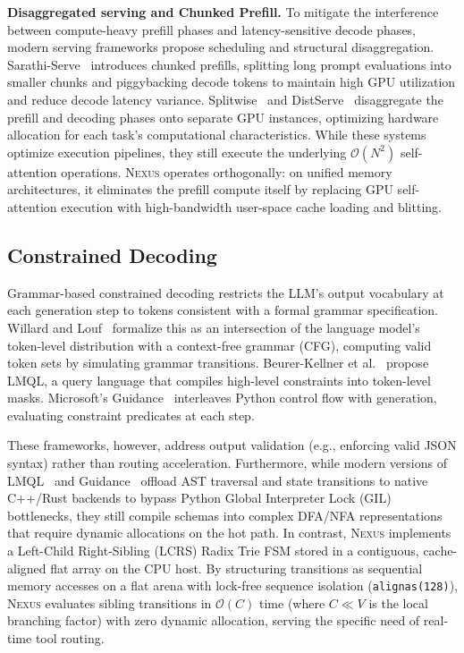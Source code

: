 \documentclass[conference,10pt]{IEEEtran}
\newcommand{\Nexus}{\textsc{Nexus}\xspace}
\begin{document}
\textbf{Disaggregated serving and Chunked Prefill.} To mitigate the interference between compute-heavy prefill phases and latency-sensitive decode phases, modern serving frameworks propose scheduling and structural disaggregation. Sarathi-Serve~\cite{agrawal2024sarathi} introduces chunked prefills, splitting long prompt evaluations into smaller chunks and piggybacking decode tokens to maintain high GPU utilization and reduce decode latency variance. Splitwise~\cite{patel2024splitwise} and DistServe~\cite{zhong2024distserve} disaggregate the prefill and decoding phases onto separate GPU instances, optimizing hardware allocation for each task's computational characteristics. While these systems optimize execution pipelines, they still execute the underlying $\mathcal{O}(N^2)$ self-attention operations. \Nexus operates orthogonally: on unified memory architectures, it eliminates the prefill compute itself by replacing GPU self-attention execution with high-bandwidth user-space cache loading and blitting.

\subsection{Constrained Decoding}
\label{subsec:rw-constrained}

Grammar-based constrained decoding restricts the LLM's output vocabulary at
each generation step to tokens consistent with a formal grammar specification.
Willard and Louf~\cite{willard2023outlines} formalize this as an intersection
of the language model's token-level distribution with a context-free grammar
(CFG), computing valid token sets by simulating grammar transitions.
Beurer-Kellner et al.~\cite{beurer2023lmql} propose LMQL, a query language
that compiles high-level constraints into token-level masks. Microsoft's
Guidance~\cite{guidance2023} interleaves Python control flow with generation,
evaluating constraint predicates at each step.

These frameworks, however, address output validation (e.g., enforcing valid JSON
syntax) rather than routing acceleration. Furthermore, while modern versions of
LMQL~\cite{beurer2023lmql} and Guidance~\cite{guidance2023} offload AST traversal
and state transitions to native C++/Rust backends to bypass Python Global Interpreter Lock (GIL)
bottlenecks, they still compile schemas into complex DFA/NFA representations that require
dynamic allocations on the hot path. In contrast, \Nexus implements a Left-Child Right-Sibling
(LCRS) Radix Trie FSM stored in a contiguous, cache-aligned flat array on the CPU host. By
structuring transitions as sequential memory accesses on a flat arena with lock-free sequence
isolation (\texttt{alignas(128)}), \Nexus evaluates sibling transitions in $\mathcal{O}(C)$ time
(where $C \ll V$ is the local branching factor) with zero dynamic allocation, serving the specific
need of real-time tool routing.
\end{document}
